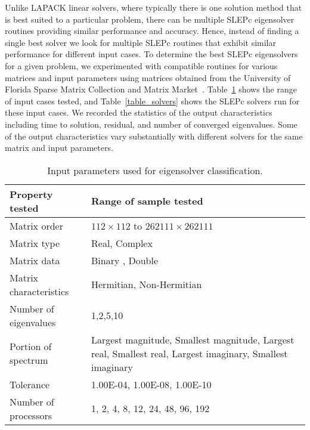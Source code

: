 \documentclass{sig-alternate}
\begin{document}
Unlike LAPACK linear solvers, where typically there is one solution method that is best suited to a particular problem, 
there can be multiple SLEPc eigensolver routines providing similar performance and accuracy. Hence, instead 
of finding a single best solver we look for multiple SLEPc routines that exhibit similar performance for different input cases.
To determine the best SLEPc eigensolvers for a given problem, we experimented with compatible routines for various
matrices and input parameters using matrices obtained from 
the University of Florida Sparse Matrix Collection and Matrix Market~\cite{matrixMarket:Online}. 
Table~\ref{table_exp} shows the range of input cases
tested, and Table~\ref{table_solvers} shows the SLEPc solvers run for these input cases.
We recorded the statistics of the output characteristics including time to solution, residual, and number of converged 
eigenvalues. Some of the output characteristics vary substantially with different solvers
for the same matrix and input parameters.
\\
\begin{table}[!htbp]
\centering
\caption{Input parameters used for eigensolver classification.}
\label{table_exp}
\begin{tabular}{|l|p{4.5cm}|}
\hline
\textbf{Property tested}                    & \textbf{Range of sample tested}                                                                                                 \\ \hline
Matrix order            & $112\times112$ to $262111\times262111$                                                                            \\ \hline
Matrix type           & Real, Complex
\\ \hline
Matrix data           & Binary , Double
\\ \hline
Matrix characteristics & Hermitian, Non-Hermitian
\\ \hline
Number of eigenvalues  & 1,2,5,10
\\ \hline
Portion of spectrum    & Largest magnitude, Smallest magnitude, Largest real, Smallest real, Largest imaginary, Smallest imaginary 
\\ \hline
Tolerance              &  1.00E-04, 1.00E-08, 1.00E-10
\\ \hline
Number of processors   & 1, 2, 4, 8, 12, 24, 48, 96, 192                                                                            \\ \hline
\end{tabular}
\end{table}
\end{document}
